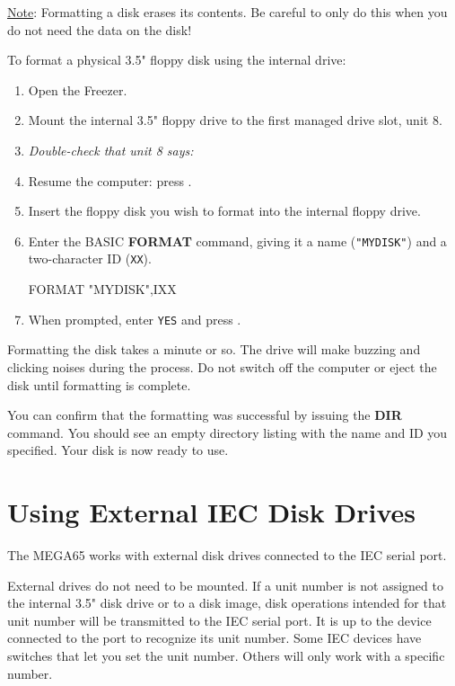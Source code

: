 \underline{Note}: Formatting a disk erases its contents. Be careful to only do this when you do not need the data on the disk!

To format a physical 3.5" floppy disk using the internal drive:

\begin{enumerate}
\item Open the Freezer.
\item Mount the internal 3.5" floppy drive to the first managed drive slot, unit 8.
\item {\it Double-check that unit 8 says:} 
\item Resume the computer: press .
\item Insert the floppy disk you wish to format into the internal floppy drive.
\item Enter the BASIC {\bf FORMAT} command, giving it a name ({\tt "MYDISK"}) and a two-character ID ({\tt XX}).
\begin{screenoutput}
FORMAT "MYDISK",IXX
\end{screenoutput}
\item When prompted, enter {\tt YES} and press .
\end{enumerate}

Formatting the disk takes a minute or so. The drive will make buzzing and clicking noises during the process. Do not switch off the computer or eject the disk until formatting is complete.

You can confirm that the formatting was successful by issuing the {\bf DIR} command. You should see an empty directory listing with the name and ID you specified. Your disk is now ready to use.


\section{Using External IEC Disk Drives}

The MEGA65 works with external disk drives connected to the IEC serial port.

External drives do not need to be mounted. If a unit number is not assigned to the internal 3.5" disk drive or to a disk image, disk operations intended for that unit number will be transmitted to the IEC serial port. It is up to the device connected to the port to recognize its unit number. Some IEC devices have switches that let you set the unit number. Others will only work with a specific number.

